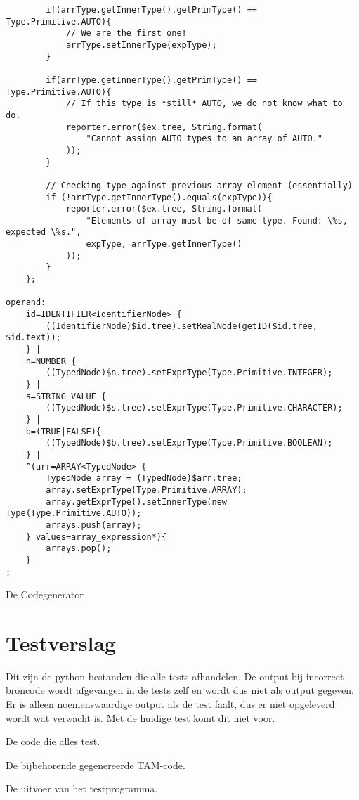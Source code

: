 \begin{landscape}
\begin{lstlisting}
        if(arrType.getInnerType().getPrimType() == Type.Primitive.AUTO){
            // We are the first one!
            arrType.setInnerType(expType);
        }

        if(arrType.getInnerType().getPrimType() == Type.Primitive.AUTO){
            // If this type is *still* AUTO, we do not know what to do.
            reporter.error($ex.tree, String.format(
                "Cannot assign AUTO types to an array of AUTO."
            ));
        }

        // Checking type against previous array element (essentially)
        if (!arrType.getInnerType().equals(expType)){
            reporter.error($ex.tree, String.format(
                "Elements of array must be of same type. Found: \%s, expected \%s.",
                expType, arrType.getInnerType()
            ));
        }
    };

operand:
    id=IDENTIFIER<IdentifierNode> {
        ((IdentifierNode)$id.tree).setRealNode(getID($id.tree, $id.text));
    } |
    n=NUMBER {
        ((TypedNode)$n.tree).setExprType(Type.Primitive.INTEGER);
    } |
    s=STRING_VALUE {
        ((TypedNode)$s.tree).setExprType(Type.Primitive.CHARACTER);
    } |
    b=(TRUE|FALSE){
        ((TypedNode)$b.tree).setExprType(Type.Primitive.BOOLEAN);
    } |
    ^(arr=ARRAY<TypedNode> {
        TypedNode array = (TypedNode)$arr.tree;
        array.setExprType(Type.Primitive.ARRAY);
        array.getExprType().setInnerType(new Type(Type.Primitive.AUTO));
        arrays.push(array);
    } values=array_expression*){
        arrays.pop();
    } 
;
\end{lstlisting}

De Codegenerator

\clearpage

\section{Testverslag} %
\label{sec:testverslag}
Dit zijn de python bestanden die alle tests afhandelen. De output bij incorrect broncode wordt afgevangen in de tests zelf en wordt dus niet als output gegeven. Er is alleen noemenswaardige output als de test faalt, dus er niet opgeleverd wordt wat verwacht is. Met de huidige test komt dit niet voor.

De code die alles test.

De bijbehorende gegenereerde TAM-code.

De uitvoer van het testprogramma.


\end{landscape}
